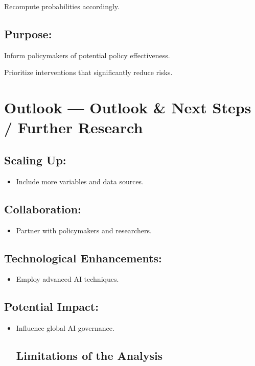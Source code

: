 \documentclass[
  letterpaper,
]{book}
\providecommand{\tightlist}{%
  \setlength{\itemsep}{0pt}\setlength{\parskip}{0pt}}
\begin{document}
Recompute probabilities accordingly.

\subsection{Purpose:}\label{purpose}

Inform policymakers of potential policy effectiveness.

Prioritize interventions that significantly reduce risks.

\section{Outlook --- Outlook \& Next Steps / Further
Research}\label{outlook-outlook-next-steps-further-research}

\subsection{Scaling Up:}\label{scaling-up}

\begin{itemize}
\tightlist
\item
  Include more variables and data sources.
\end{itemize}

\subsection{Collaboration:}\label{collaboration}

\begin{itemize}
\tightlist
\item
  Partner with policymakers and researchers.
\end{itemize}

\subsection{Technological
Enhancements:}\label{technological-enhancements}

\begin{itemize}
\tightlist
\item
  Employ advanced AI techniques.
\end{itemize}

\subsection{Potential Impact:}\label{potential-impact}

\begin{itemize}
\item
  Influence global AI governance.

  \subsection{Limitations of the
  Analysis}\label{limitations-of-the-analysis}
\end{itemize}
\end{document}
